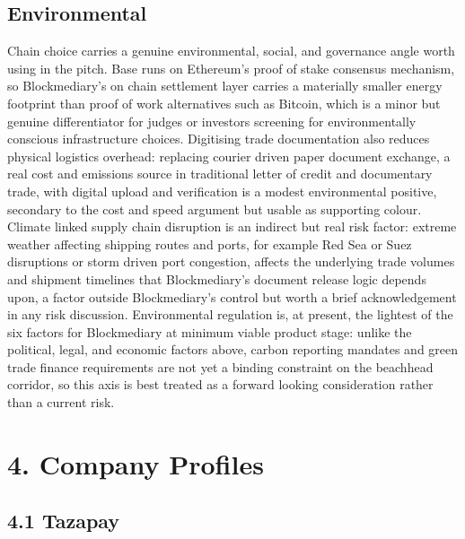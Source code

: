 \documentclass[12pt, a4paper]{article}
\begin{document}
\subsection*{Environmental}

Chain choice carries a genuine environmental, social, and governance angle worth using in
the pitch. Base runs on Ethereum's proof of stake consensus mechanism, so Blockmediary's on
chain settlement layer carries a materially smaller energy footprint than proof of work
alternatives such as Bitcoin, which is a minor but genuine differentiator for judges or
investors screening for environmentally conscious infrastructure choices. Digitising trade
documentation also reduces physical logistics overhead: replacing courier driven paper
document exchange, a real cost and emissions source in traditional letter of credit and
documentary trade, with digital upload and verification is a modest environmental
positive, secondary to the cost and speed argument but usable as supporting colour.
Climate linked supply chain disruption is an indirect but real risk factor: extreme
weather affecting shipping routes and ports, for example Red Sea or Suez disruptions or
storm driven port congestion, affects the underlying trade volumes and shipment timelines
that Blockmediary's document release logic depends upon, a factor outside Blockmediary's
control but worth a brief acknowledgement in any risk discussion. Environmental regulation
is, at present, the lightest of the six factors for Blockmediary at minimum viable product
stage: unlike the political, legal, and economic factors above, carbon reporting mandates
and green trade finance requirements are not yet a binding constraint on the beachhead
corridor, so this axis is best treated as a forward looking consideration rather than a
current risk.

\section*{4. Company Profiles}

\subsection*{4.1 Tazapay}
\end{document}
